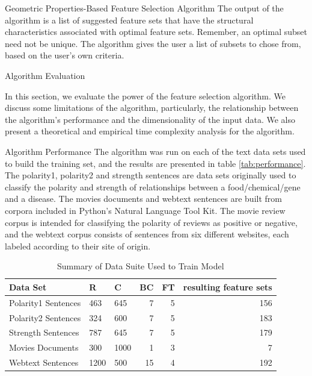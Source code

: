 \documentclass{llncs}
\begin{document}
\begin{section}{Geometric Properties-Based Feature Selection Algorithm}
The output of the algorithm is a list of suggested feature sets that have the structural characteristics associated with optimal feature sets. Remember, an optimal subset need not be unique. The algorithm gives the user a list of subsets to chose from, based on the user's own criteria.

\end{section}



\begin{section}{Algorithm Evaluation}

In this section, we evaluate the power of the feature selection algorithm. We discuss some limitations of the algorithm, particularly, the relationship between the algorithm's performance and the dimensionality of the input data. We also present a theoretical and empirical time complexity analysis for the algorithm.

\begin{subsection}{Algorithm Performance}
The algorithm was run on each of the text data sets used to build the training set, and the results are presented in table \ref{tab:performance}. The polarity1, polarity2 and strength sentences are data sets originally used to classify the polarity and strength of relationships between a food/chemical/gene and a disease\cite{Yang}. The movies documents\cite{Movies} and webtext sentences\cite{nltk} are built from corpora included in Python's Natural Language Tool Kit\cite{nltk}. The movie review corpus is intended for classifying the polarity of reviews as positive or negative, and the webtext corpus consists of sentences from six different websites, each labeled according to their site of origin. 
\begin{table}[ht]
\centering
\caption{Summary of Data Suite Used to Train Model}
\begin{tabular}{l l l r r r}
\hline \hline
Data Set & R & C & BC & FT & resulting feature sets\\
\hline
Polarity1 Sentences &  463 & 645 & 7 & 5 & 156  \\
Polarity2 Sentences  &  324 & 600 & 7 & 5 & 183\\
Strength Sentences  & 787 & 645 & 7 & 5 & 179\\
Movies Documents   & 300 & 1000 & 1 & 3 & 7 \\
Webtext Sentences  & 1200 & 500 & 15 & 4 & 192\\
\hline
\end{tabular}
\label{tab:trainData}
\end{table}


\end{subsection}
\end{section}
\end{document}
